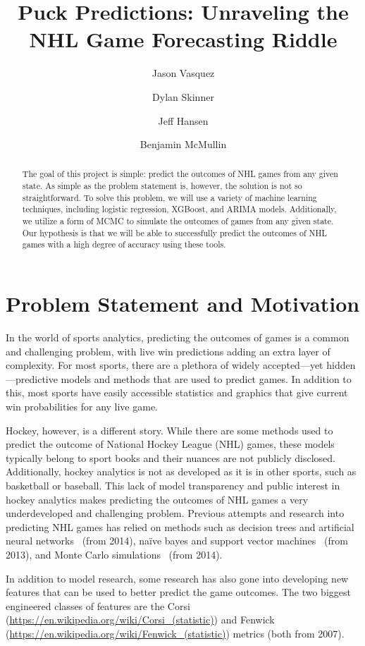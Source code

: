 \documentclass[11pt]{article}
\title{Puck Predictions: Unraveling the NHL Game Forecasting Riddle}
\author{Jason Vasquez \and Dylan Skinner \and Jeff Hansen \and Benjamin McMullin}
\begin{document}
\maketitle

\begin{abstract}
    The goal of this project is simple: predict the outcomes of NHL games from any given state.
    As simple as the problem statement is, however, the solution is not so straightforward.
    To solve this problem, we will use a variety of machine learning techniques, including logistic regression,
    XGBoost, and ARIMA models. Additionally, we utilize a form of MCMC to simulate the outcomes of games from any given
    state. Our hypothesis is that we will be able to successfully predict the outcomes of NHL games with a high degree of accuracy
    using these tools.
\end{abstract}

\section{Problem Statement and Motivation}
In the world of sports analytics, predicting the outcomes of games is a common and challenging problem, with live win predictions adding
an extra layer of complexity. For most sports, there are a plethora of widely accepted—yet hidden—predictive models and methods that are used to
predict games. In addition to this, most sports have easily accessible statistics and graphics that give current win probabilities for any live game.

Hockey, however, is a different story. While there are some methods used to predict the outcome of National Hockey League (NHL) games, these models
typically belong to sport books and their nuances are not publicly disclosed. Additionally, hockey analytics is not as
developed as it is in other sports, such as basketball or baseball. This lack of model transparency and public interest in hockey analytics
makes predicting the outcomes of NHL games a very underdeveloped and challenging problem. Previous attempts and research into predicting NHL games
has relied on methods such as decision trees and artificial neural networks~\cite{pishcedda} (from 2014), naïve bayes and support vector machines~\cite{weissbock2013use} (from 2013),
and Monte Carlo simulations~\cite{Weissbock2014ForecastingSI} (from 2014).

In addition to model research, some research has also gone into developing new features that can be used to better predict the game outcomes. 
The two biggest engineered classes of features are the Corsi (\url{https://en.wikipedia.org/wiki/Corsi_(statistic)})
 and Fenwick (\url{https://en.wikipedia.org/wiki/Fenwick_(statistic)}) metrics (both from 2007). 
\end{document}
